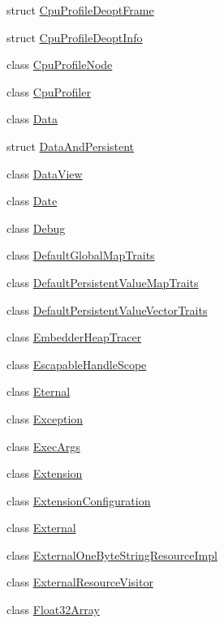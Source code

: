 \begin{DoxyCompactItemize}
struct \hyperlink{structv8_1_1_cpu_profile_deopt_frame}{Cpu\+Profile\+Deopt\+Frame}
\item 
struct \hyperlink{structv8_1_1_cpu_profile_deopt_info}{Cpu\+Profile\+Deopt\+Info}
\item 
class \hyperlink{classv8_1_1_cpu_profile_node}{Cpu\+Profile\+Node}
\item 
class \hyperlink{classv8_1_1_cpu_profiler}{Cpu\+Profiler}
\item 
class \hyperlink{classv8_1_1_data}{Data}
\item 
struct \hyperlink{structv8_1_1_data_and_persistent}{Data\+And\+Persistent}
\item 
class \hyperlink{classv8_1_1_data_view}{Data\+View}
\item 
class \hyperlink{classv8_1_1_date}{Date}
\item 
class \hyperlink{classv8_1_1_debug}{Debug}
\item 
class \hyperlink{classv8_1_1_default_global_map_traits}{Default\+Global\+Map\+Traits}
\item 
class \hyperlink{classv8_1_1_default_persistent_value_map_traits}{Default\+Persistent\+Value\+Map\+Traits}
\item 
class \hyperlink{classv8_1_1_default_persistent_value_vector_traits}{Default\+Persistent\+Value\+Vector\+Traits}
\item 
class \hyperlink{classv8_1_1_embedder_heap_tracer}{Embedder\+Heap\+Tracer}
\item 
class \hyperlink{classv8_1_1_escapable_handle_scope}{Escapable\+Handle\+Scope}
\item 
class \hyperlink{classv8_1_1_eternal}{Eternal}
\item 
class \hyperlink{classv8_1_1_exception}{Exception}
\item 
class \hyperlink{classv8_1_1_exec_args}{Exec\+Args}
\item 
class \hyperlink{classv8_1_1_extension}{Extension}
\item 
class \hyperlink{classv8_1_1_extension_configuration}{Extension\+Configuration}
\item 
class \hyperlink{classv8_1_1_external}{External}
\item 
class \hyperlink{classv8_1_1_external_one_byte_string_resource_impl}{External\+One\+Byte\+String\+Resource\+Impl}
\item 
class \hyperlink{classv8_1_1_external_resource_visitor}{External\+Resource\+Visitor}
\item 
class \hyperlink{classv8_1_1_float32_array}{Float32\+Array}

\end{DoxyCompactItemize}
